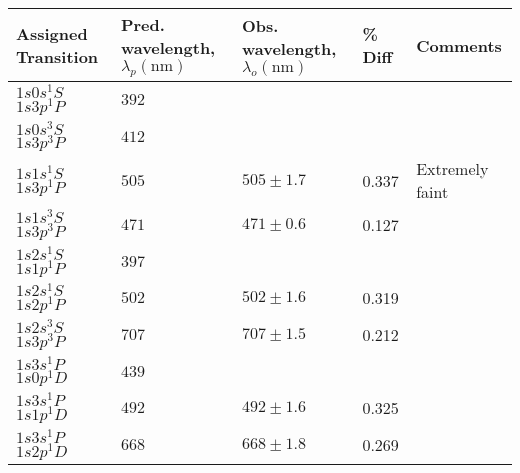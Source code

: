 \documentclass[10pt, twocolumn]{article}
\theoremstyle{definition}
\begin{document}
\begin{table}[h]
  \centering%
  \begin{tabular}{p{}p{}p{}p{}p{}}
    \toprule
    Assigned Transition         & Pred. wavelength, $\lambda_p (\unit{\nano\meter})$ & Obs. wavelength, $\lambda_o (\unit{\nano\meter})$ & \% Diff & Comments        \\
    \midrule
    $1s0s{}^1\!S$ $1s3p{}^1\!P$ & $392$                                              &                                                   &         &                 \\
    \hline
    $1s0s{}^3\!S$ $1s3p{}^3\!P$ & $412$                                              &                                                   &         &                 \\
    \hline
    $1s1s{}^1\!S$ $1s3p{}^1\!P$ & $505$                                              & $505\pm1.7$                                       & 0.337   & Extremely faint \\
    \hline
    $1s1s{}^3\!S$ $1s3p{}^3\!P$ & $471$                                              & $471\pm0.6$                                       & 0.127   &                 \\
    \hline
    $1s2s{}^1\!S$ $1s1p{}^1\!P$ & $397$                                              &                                                   &         &                 \\
    \hline
    $1s2s{}^1\!S$ $1s2p{}^1\!P$ & $502$                                              & $502\pm1.6$                                       & 0.319   &                 \\
    \hline
    $1s2s{}^3\!S$ $1s3p{}^3\!P$ & $707$                                              & $707\pm1.5$                                       & 0.212   &                 \\
    \hline
    $1s3s{}^1\!P$ $1s0p{}^1\!D$ & $439$                                              &                                                   &         &                 \\
    \hline
    $1s3s{}^1\!P$ $1s1p{}^1\!D$ & $492$                                              & $492\pm1.6$                                       & 0.325   &                 \\
    \hline
    $1s3s{}^1\!P$ $1s2p{}^1\!D$ & $668$                                              & $668\pm1.8$                                       & 0.269   &                 \\

\end{tabular}
\end{table}
\end{document}

